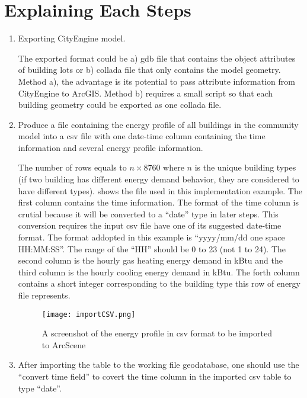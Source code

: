 \section{Explaining Each Steps}
\begin{enumerate}[1)]
\item Exporting CityEngine model. 

  The exported format could be a) gdb file that contains the object
  attributes of building lots or b) collada file that only contains
  the model geometry. Method a), the advantage is its potential to
  pass attribute information from CityEngine to ArcGIS. Method b)
  requires a small script so that each building geometry could be
  exported as one collada file.

\item Produce a file containing the energy profile of all buildings in
  the community model into a csv file with one date-time column
  containing the time information and several energy profile
  information. 

  The number of rows equals to $n \times 8760$ where $n$ is the unique
  building types (if two building has different energy demand
  behavior, they are considered to have different types).
   shows the file used in this implementation
  example. The first column contains the time information. The format
  of the time column is crutial because it will be converted to a
  ``date'' type in later steps. This conversion requires the input csv
  file have one of its suggested date-time format. The format addopted
  in this example is ``yyyy/mm/dd one space HH:MM:SS''. The range of
  the ``HH'' should be 0 to 23 (not 1 to 24). The second column is the
  hourly gas heating energy demand in kBtu and the third column is the
  hourly cooling energy demand in kBtu. The forth column contains a
  short integer corresponding to the building type this row of energy
  file represents.

\begin{figure}[h!]
  \centering
  \texttt{[image: importCSV.png]}
  \caption[Imported CSV]{A screenshot of the energy profile in csv
    format to be imported to ArcScene}
  \label{fig:importCSV}
\end{figure}

\item After importing the table to the working file geodatabase, one
  should use the ``convert time field'' to covert the time column in
  the imported csv table to type ``date''.


\end{enumerate}
